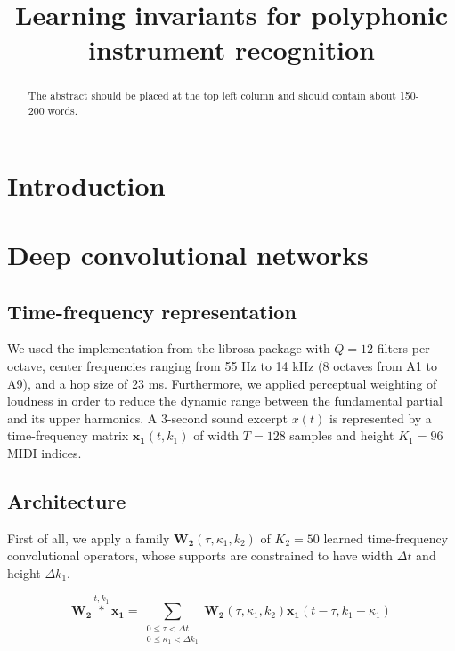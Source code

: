 \documentclass{article}
\title{Learning invariants for polyphonic instrument recognition}
\begin{document}
%
\maketitle
%
\begin{abstract}
The abstract should be placed at the top left column and should contain about 150-200 words.
\end{abstract}
%

\section{Introduction}\label{sec:introduction}


\section{Deep convolutional networks}
\subsection{Time-frequency representation}
We used the implementation from the librosa package \cite{McFee2015} with $Q=12$ filters per octave, center frequencies ranging from 55 Hz to 14 kHz (8 octaves from A1 to A9), and a hop size of 23 ms. Furthermore, we applied perceptual weighting of loudness in order to reduce the dynamic range between the fundamental partial and its upper harmonics. A 3-second sound excerpt $x(t)$ is represented by a time-frequency matrix $\boldsymbol{x_1}(t,k_1)$ of width $T=128$ samples and height $K_1=96$ MIDI indices.

\subsection{Architecture}
First of all, we apply a family $\boldsymbol{W_2}(\tau,\kappa_1,k_2)$ of $K_2=50$ learned time-frequency convolutional operators, whose supports are constrained to have width $\Delta t$ and height $\Delta k_1$. 

\begin{equation}
\boldsymbol{W_2}
\overset{t,k_1}{\ast}
\boldsymbol{x_1}
=
\! \!
\sum_{\substack{
0 \leq \tau < \Delta t \\
0 \leq \kappa_1 < \Delta k_1}} 
\! \! \! \! \!
\boldsymbol{W_2}(\tau,\kappa_1,k_2)
\boldsymbol{x_1}(t-\tau,k_1-\kappa_1)
\end{equation}
\end{document}
